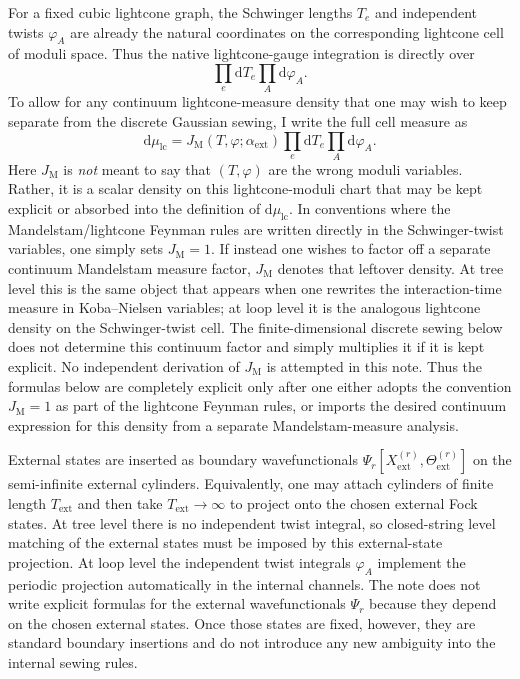 \documentclass[11pt]{article}
\numberwithin{equation}{section}
\newcommand{\dd}{\mathrm{d}}
\begin{document}
For a fixed cubic lightcone graph, the Schwinger lengths $T_e$ and independent twists $\varphi_A$ are already the natural coordinates on the corresponding lightcone cell of moduli space. Thus the native lightcone-gauge integration is directly over
\[
\prod_e \dd T_e \prod_A \dd\varphi_A.
\]
To allow for any continuum lightcone-measure density that one may wish to keep separate from the discrete Gaussian sewing, I write the full cell measure as
\begin{equation}
\label{eq:s8-003}
\dd\mu_{\mathrm{lc}}
=
J_{\mathrm{M}}(T,\varphi;\alpha_{\mathrm{ext}})
\prod_e \dd T_e
\prod_A \dd\varphi_A.
\end{equation}
Here $J_{\mathrm{M}}$ is \emph{not} meant to say that $(T,\varphi)$ are the wrong moduli variables. Rather, it is a scalar density on this lightcone-moduli chart that may be kept explicit or absorbed into the definition of $\dd\mu_{\mathrm{lc}}$. In conventions where the Mandelstam/lightcone Feynman rules are written directly in the Schwinger-twist variables, one simply sets $J_{\mathrm{M}}=1$. If instead one wishes to factor off a separate continuum Mandelstam measure factor, $J_{\mathrm{M}}$ denotes that leftover density. At tree level this is the same object that appears when one rewrites the interaction-time measure in Koba--Nielsen variables; at loop level it is the analogous lightcone density on the Schwinger-twist cell. The finite-dimensional discrete sewing below does not determine this continuum factor and simply multiplies it if it is kept explicit.
No independent derivation of $J_{\mathrm{M}}$ is attempted in this note. Thus the formulas below are completely explicit only after one either adopts the convention $J_{\mathrm{M}}=1$ as part of the lightcone Feynman rules, or imports the desired continuum expression for this density from a separate Mandelstam-measure analysis.

External states are inserted as boundary wavefunctionals $\Psi_r[X_{\mathrm{ext}}^{(r)},\Theta_{\mathrm{ext}}^{(r)}]$ on the semi-infinite external cylinders. Equivalently, one may attach cylinders of finite length $T_{\mathrm{ext}}$ and then take $T_{\mathrm{ext}}\to\infty$ to project onto the chosen external Fock states. At tree level there is no independent twist integral, so closed-string level matching of the external states must be imposed by this external-state projection. At loop level the independent twist integrals $\varphi_A$ implement the periodic projection automatically in the internal channels.
The note does not write explicit formulas for the external wavefunctionals $\Psi_r$ because they depend on the chosen external states. Once those states are fixed, however, they are standard boundary insertions and do not introduce any new ambiguity into the internal sewing rules.
\end{document}

